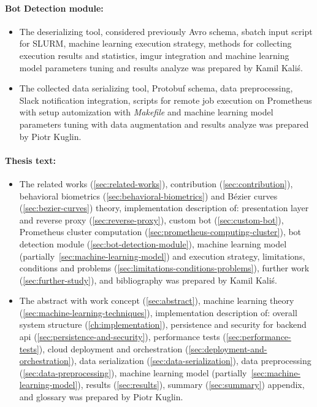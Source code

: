 \begin{minipage}{\textwidth}
    \paragraph{Bot Detection module:}
    \begin{itemize}[label=$\bullet$]
        \item The deserializing tool, considered previously Avro schema, sbatch input script for SLURM, machine learning execution strategy, methods for collecting execution results and statistics, imgur integration and machine learning model parameters tuning and results analyze was prepared by Kamil Kaliś.
        \item The collected data serializing tool, Protobuf schema, data preprocessing, Slack notification integration, scripts for remote job execution on Prometheus with setup automization with \textit{Makefile} and machine learning model parameters tuning with data augmentation and results analyze was prepared by Piotr Kuglin.
    \end{itemize}
\end{minipage}

\begin{minipage}{\textwidth}
    \paragraph{Thesis text:}
    \begin{itemize}[label=$\bullet$]
        \item The related works (\ref{sec:related-works}), contribution (\ref{sec:contribution}), behavioral biometrics (\ref{sec:behavioral-biometrics}) and Bézier curves (\ref{sec:bezier-curves}) theory, implementation description of: presentation layer and reverse proxy (\ref{sec:reverse-proxy}), custom bot (\ref{sec:custom-bot}), Prometheus cluster computation (\ref{sec:prometheus-computing-cluster}), bot detection module (\ref{sec:bot-detection-module}), machine learning model (partially~\ref{sec:machine-learning-model}) and execution strategy, limitations, conditions and problems (\ref{sec:limitations-conditions-problems}), further work (\ref{sec:further-study}), and bibliography was prepared by Kamil Kaliś.
        \item The abstract with work concept (\ref{sec:abstract}), machine learning theory (\ref{sec:machine-learning-techniques}), implementation description of: overall system structure (\ref{ch:implementation}), persistence and security for backend \gls{api} (\ref{sec:persistence-and-security}), performance tests (\ref{sec:performance-tests}), cloud deployment and orchestration (\ref{sec:deployment-and-orchestration}), data serialization (\ref{sec:data-serialization}), data preprocessing (\ref{sec:data-preprocessing}), machine learning model (partially~\ref{sec:machine-learning-model}), results (\ref{sec:results}), summary (\ref{sec:summary}) appendix, and glossary was prepared by Piotr Kuglin.
    \end{itemize}
\end{minipage}